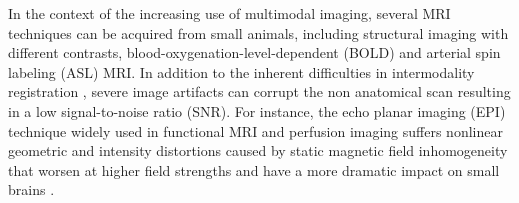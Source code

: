 \documentclass[utf8, a4paper, final, crop]{frontiersSCNS}
\begin{document}
In the context of the increasing use of multimodal imaging, several %
MRI 
techniques 
can 
be acquired from small animals, including %
structural imaging with different contrasts, 
blood-oxygenation-level-dependent (BOLD) and  arterial spin labeling (ASL) MRI.
%
In addition to the inherent difficulties in intermodality registration \citep{ashburner1997multimodal},
severe image artifacts can corrupt the non anatomical scan
resulting in a low signal-to-noise ratio (SNR).
For instance, the echo 
planar imaging (EPI) %
technique widely used in %
functional MRI and perfusion imaging
suffers nonlinear geometric and intensity distortions caused by static magnetic field 
inhomogeneity that 
worsen at higher field strengths and have a more dramatic impact on small brains
\citep{hong2015evaluation}. 
\end{document}
